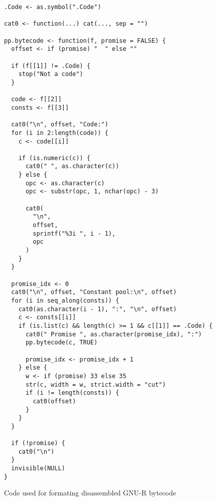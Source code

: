 \begin{listing}
  \begin{verbatim}
.Code <- as.symbol(".Code")

cat0 <- function(...) cat(..., sep = "")

pp.bytecode <- function(f, promise = FALSE) {
  offset <- if (promise) "  " else ""

  if (f[[1]] != .Code) {
    stop("Not a code")
  }

  code <- f[[2]]
  consts <- f[[3]]

  cat0("\n", offset, "Code:")
  for (i in 2:length(code)) {
    c <- code[[i]]

    if (is.numeric(c)) {
      cat0(" ", as.character(c))
    } else {
      opc <- as.character(c)
      opc <- substr(opc, 1, nchar(opc) - 3)

      cat0(
        "\n",
        offset,
        sprintf("%3i ", i - 1),
        opc
      )
    }
  }

  promise_idx <- 0
  cat0("\n", offset, "Constant pool:\n", offset)
  for (i in seq_along(consts)) {
    cat0(as.character(i - 1), ":", "\n", offset)
    c <- consts[[i]]
    if (is.list(c) && length(c) >= 1 && c[[1]] == .Code) {
      cat0(" Promise ", as.character(promise_idx), ":")
      pp.bytecode(c, TRUE)

      promise_idx <- promise_idx + 1
    } else {
      w <- if (promise) 33 else 35
      str(c, width = w, strict.width = "cut")
      if (i != length(consts)) {
        cat0(offset)
      }
    }
  }

  if (!promise) {
    cat0("\n")
  }
  invisible(NULL)
}
  \end{verbatim}
  \caption{Code used for formating disassembled GNU-R bytecode}\label{lst:pp-gnur-bc}
\end{listing}

